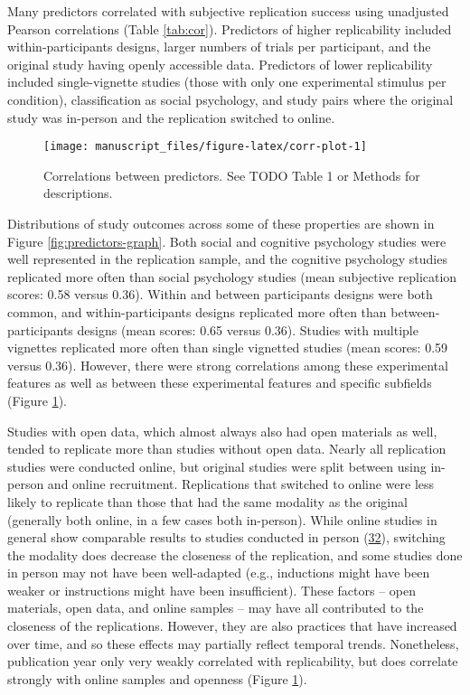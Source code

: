 \documentclass[
  english,
  a4paper,
]{article}
\begin{document}
Many predictors correlated with subjective replication success using unadjusted Pearson correlations (Table \ref{tab:cor}). Predictors of higher replicability included within-participants designs, larger numbers of trials per participant, and the original study having openly accessible data. Predictors of lower replicability included single-vignette studies (those with only one experimental stimulus per condition), classification as social psychology, and study pairs where the original study was in-person and the replication switched to online.

\begin{figure}[ht]
\texttt{[image: manuscript\_files/figure-latex/corr-plot-1]} \caption{Correlations between predictors. See TODO Table 1 or Methods for descriptions. }\label{fig:corr-plot}
\end{figure}

Distributions of study outcomes across some of these properties are shown in Figure \ref{fig:predictors-graph}. Both social and cognitive psychology studies were well represented in the replication sample, and the cognitive psychology studies replicated more often than social psychology studies (mean subjective replication scores: 0.58 versus 0.36). Within and between participants designs were both common, and within-participants designs replicated more often than between-participants designs (mean scores: 0.65 versus 0.36). Studies with multiple vignettes replicated more often than single vignetted studies (mean scores: 0.59 versus 0.36). However, there were strong correlations among these experimental features as well as between these experimental features and specific subfields (Figure \ref{fig:corr-plot}).

Studies with open data, which almost always also had open materials as well, tended to replicate more than studies without open data. Nearly all replication studies were conducted online, but original studies were split between using in-person and online recruitment. Replications that switched to online were less likely to replicate than those that had the same modality as the original (generally both online, in a few cases both in-person). While online studies in general show comparable results to studies conducted in person (\protect\hyperlink{ref-crump2013}{32}), switching the modality does decrease the closeness of the replication, and some studies done in person may not have been well-adapted (e.g., inductions might have been weaker or instructions might have been insufficient). These factors -- open materials, open data, and online samples -- may have all contributed to the closeness of the replications. However, they are also practices that have increased over time, and so these effects may partially reflect temporal trends. Nonetheless, publication year only very weakly correlated with replicability, but does correlate strongly with online samples and openness (Figure \ref{fig:corr-plot}).
\end{document}

